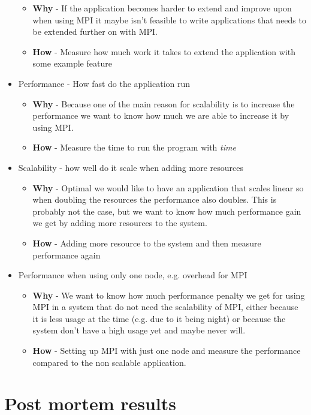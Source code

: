 \documentclass{article}
\begin{document}
\begin{itemize}
\begin{itemize}
\item{ \textbf{Why} - If the application becomes harder to extend and improve upon 
when using MPI it maybe isn't feasible to write applications that
needs to be extended further on with MPI.}
\item{ \textbf{How} - Measure how much work it takes to extend the application with 
		some example feature}
\end{itemize}
\item Performance - How fast do the application run
\begin{itemize}
\item{ \textbf{Why} - Because one of the main reason for scalability is to increase the
 performance we want to know how much we are able to increase it by using MPI. }
\item{ \textbf{How} - Measure the time to run the program with \emph{time}}
\end{itemize}
\item Scalability - how well do it scale when adding more resources
\begin{itemize}
\item{ \textbf{Why} - Optimal we would like to have an application that scales linear
 so when doubling the resources the performance also doubles. This is probably 
 not the case, but we want to know how much performance gain we get by adding
 more resources to the system. }
\item{ \textbf{How} - Adding more resource to the system and then measure performance
 again}
\end{itemize}
\item Performance when using only one node, e.g. overhead for MPI
\begin{itemize}
\item{ \textbf{Why} - We want to know how much performance penalty we get for using
MPI in a system that do not need the scalability of MPI, either because it is 
less usage at the time (e.g. due to it being night) or because the system
don't have a high usage yet and maybe never will.}
\item{ \textbf{How} - Setting up MPI with just one node and measure the performance
 compared to the non scalable application. }
\end{itemize}
\end{itemize}


\section{Post mortem results}
\end{document}
